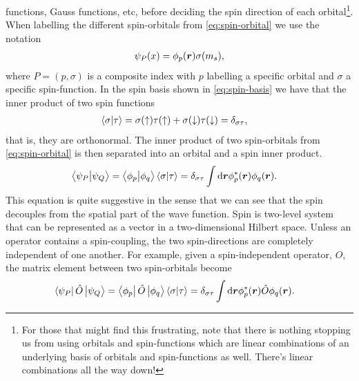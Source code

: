         functions, Gauss functions, etc, before deciding the spin direction of
        each orbital\footnote{
            For those that might find this frustrating, note that there is
            nothing stopping us from using orbitals and spin-functions which are
            linear combinations of an underlying basis of orbitals and
            spin-functions as well.
            There's linear combinations all the way down!
        }.
        When labelling the different spin-orbitals from
        \autoref{eq:spin-orbital} we use the notation
        \begin{align}
            \psi_P(x) = \phi_p(\boldsymbol{r})\sigma(m_s),
        \end{align}
        where $P = (p, \sigma)$ is a composite index with $p$ labelling a
        specific orbital and $\sigma$ a specific spin-function.
        In the spin basis shown in \autoref{eq:spin-basis} we have that the
        inner product of two spin functions
        \begin{align}
            \braket{\sigma}{\tau}
            &=
            \sigma(\uparrow)\tau(\uparrow)
            + \sigma(\downarrow)\tau(\downarrow)
            = \delta_{\sigma\tau},
        \end{align}
        that is, they are orthonormal.
        The inner product of two spin-orbitals from \autoref{eq:spin-orbital} is
        then separated into an orbital and a spin inner product.
        \begin{align}
            \braket{\psi_P}{\psi_Q}
            &= \braket{\phi_p}{\phi_q}\braket{\sigma}{\tau}
            = \delta_{\sigma\tau}
            \int\dd\boldsymbol{r}\phi^{*}_{p}(\boldsymbol{r})\phi_{q}(\boldsymbol{r}).
            \label{eq:inner-spin-orbital}
        \end{align}
        This equation is quite suggestive in the sense that we can see that the
        spin decouples from the spatial part of the wave function.
        Spin is two-level system that can be represented as a vector in a
        two-dimensional Hilbert space.
        Unless an operator contains a spin-coupling, the two spin-directions are
        completely independent of one another.
        For example, given a spin-independent operator, $\hat{O}$, the
        matrix element between two spin-orbitals become
        \begin{align}
            \bra{\psi_P}\hat{O}\ket{\psi_Q}
            &= \bra{\phi_p}\hat{O}\ket{\phi_q}\braket{\sigma}{\tau}
            = \delta_{\sigma\tau}
            \int\dd\boldsymbol{r}\phi^{*}_{p}(\boldsymbol{r})\hat{O}\phi_q(\boldsymbol{r}).
            \label{eq:example-spin-decoupling}
        \end{align}
